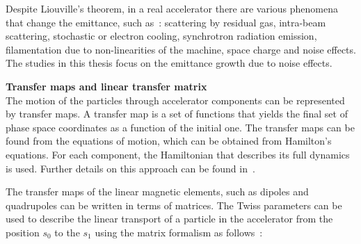  
 
Despite Liouville's theorem, in a real accelerator there are various phenomena that change the emittance, such as~\cite{Buon:216507}: scattering by residual gas, intra-beam scattering, stochastic or electron cooling, synchrotron radiation emission, filamentation due to non-linearities of the machine, space charge and noise effects. The studies in this thesis focus on the emittance growth due to noise effects.
 

\textbf{Transfer maps and linear transfer matrix}\\
The motion of the particles through accelerator components can be represented by transfer maps. A transfer map is a set of functions that yields the final set of phase space coordinates as a function of the initial one.
The transfer maps can be found from the equations of motion, which can be obtained from Hamilton's equations. For each component, the Hamiltonian that describes its full dynamics is used. Further details on this approach can be found in~\cite{wolski2014}. %

The transfer maps of the linear magnetic elements, such as dipoles and quadrupoles can be written in terms of matrices. The Twiss parameters can be used to describe the linear transport of a particle in the accelerator from the position $s_0$ to the $s_1$ using the matrix formalism as follows~\cite{Lee:1425444}: %

